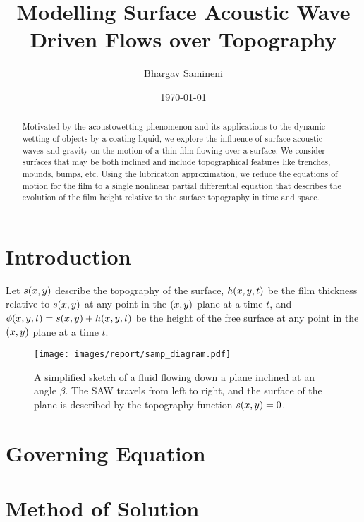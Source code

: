 \documentclass[letterpaper]{article}
\title{Modelling Surface Acoustic Wave Driven Flows over Topography}
\author{Bhargav Samineni}
\date{\today}
\begin{document}
 
\maketitle

\begin{abstract}
    Motivated by the acoustowetting phenomenon and its applications to the dynamic wetting 
    of objects by a coating liquid, we explore the influence of surface acoustic waves and gravity on the motion of a thin film
    flowing over a surface. We consider surfaces that may be both inclined and include topographical features like trenches, mounds, bumps, etc. 
    Using the lubrication approximation, we reduce the equations of motion for the film
    to a single nonlinear partial differential equation that describes the evolution of the film height relative to the 
    surface topography in time and space. 
\end{abstract}


\section{Introduction}

Let $s\!\left( x, y \right)$ describe the topography of the surface, 
$h\!\left( x,y,t \right)$ be the film thickness relative to $s\!\left( x,y \right)$ at any point in the $\left( x,y \right)$ plane at a time $t$, 
and $\phi\!\left( x,y,t \right) = s\!\left( x,y \right) + h\!\left( x,y,t \right)$ be the height of the free surface at any point in the $\left( x,y \right)$ plane at a time $t$.

\begin{figure}[hb]  
    \centering
    \texttt{[image: images/report/samp\_diagram.pdf]}
    \caption{A simplified sketch of a fluid flowing down a plane inclined at an angle $\beta$. The SAW travels
    from left to right, and the surface of the plane is described by the topography function $s\!\left( x, y \right) = 0$.}
    \label{fig:diagram}
\end{figure}

\section{Governing Equation} \label{sec:gov_eq}

 
\section{Method of Solution} \label{sec:method_of_sol}

\end{document}
